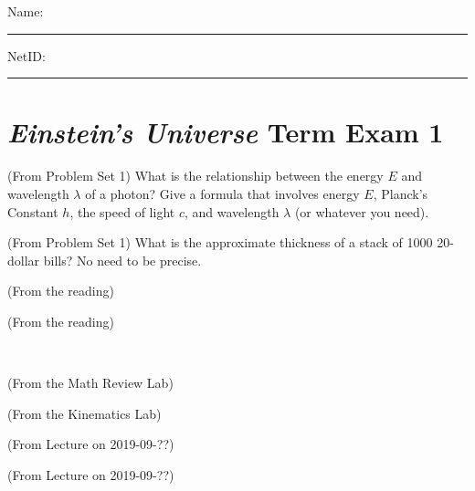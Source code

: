 \documentclass[12pt, letterpaper]{article}
\begin{document}
\noindent
Name: \rule[-1ex]{0.60\textwidth}{0.1pt}
NetID: \rule[-1ex]{0.20\textwidth}{0.1pt}

\section*{\textsl{Einstein's Universe} Term Exam 1}

\begin{problem} (From Problem Set 1)
What is the relationship between the energy $E$ and wavelength
$\lambda$ of a photon? Give a formula that involves energy $E$,
Planck's Constant $h$, the speed of light $c$, and wavelength
$\lambda$ (or whatever you need).
\end{problem}

\vfill

\begin{problem} (From Problem Set 1)
What is the approximate thickness of a stack of 1000 20-dollar bills?
No need to be precise.
\end{problem}

\vfill

\begin{problem} (From the reading)
\end{problem}

\vfill

\begin{problem} (From the reading)
\end{problem}

\vfill ~ \clearpage

\begin{problem} (From the Math Review Lab)
\end{problem}

\vfill

\begin{problem} (From the Kinematics Lab)
\end{problem}

\vfill

\begin{problem} (From Lecture on 2019-09-??)
\end{problem}

\vfill

\begin{problem} (From Lecture on 2019-09-??)
\end{problem}

\vfill ~
\end{document}
